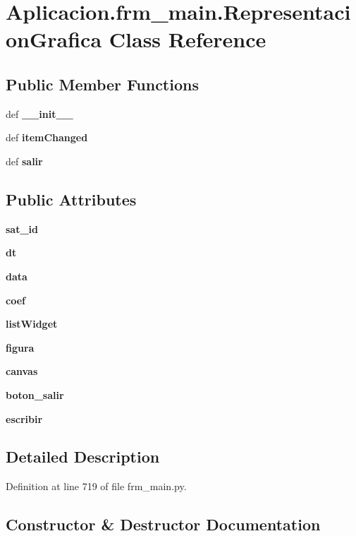 \section{\-Aplicacion.\-frm\-\_\-main.\-Representacion\-Grafica \-Class \-Reference}
\label{class_aplicacion_1_1frm__main_1_1_representacion_grafica}
\subsection*{\-Public \-Member \-Functions}
\begin{DoxyCompactItemize}
\item 
def {\bf \-\_\-\-\_\-init\-\_\-\-\_\-}
\item 
def {\bf item\-Changed}
\item 
def {\bf salir}
\end{DoxyCompactItemize}
\subsection*{\-Public \-Attributes}
\begin{DoxyCompactItemize}
\item 
{\bf sat\-\_\-id}
\item 
{\bf dt}
\item 
{\bf data}
\item 
{\bf coef}
\item 
{\bf list\-Widget}
\item 
{\bf figura}
\item 
{\bf canvas}
\item 
{\bf boton\-\_\-salir}
\item 
{\bf escribir}
\end{DoxyCompactItemize}


\subsection{\-Detailed \-Description}


\-Definition at line 719 of file frm\-\_\-main.\-py.



\subsection{\-Constructor \& \-Destructor \-Documentation}
